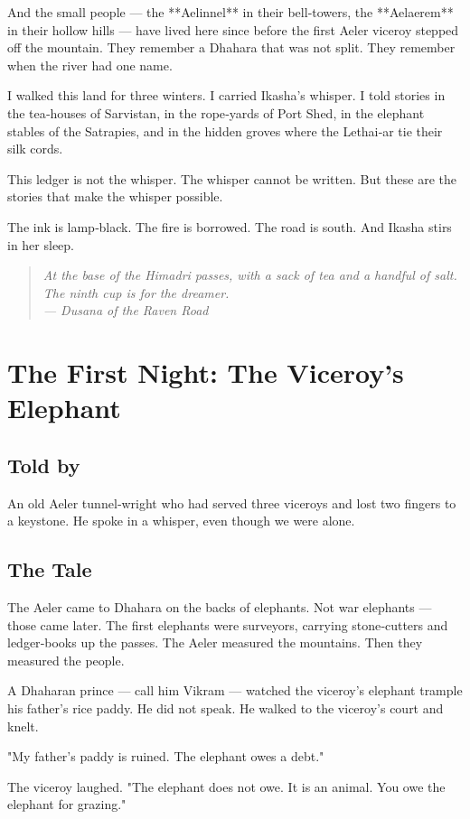 \documentclass[10pt,twoside]{book}
\newcommand{\dusana}[1]{\begin{quote}\itshape #1 \\ --- Dusana of the Raven Road\end{quote}}
\begin{document}
And the small people --- the **Aelinnel** in their bell‑towers, the **Aelaerem** in their hollow hills --- have lived here since before the first Aeler viceroy stepped off the mountain. They remember a Dhahara that was not split. They remember when the river had one name.

I walked this land for three winters. I carried Ikasha's whisper. I told stories in the tea‑houses of Sarvistan, in the rope‑yards of Port Shed, in the elephant stables of the Satrapies, and in the hidden groves where the Lethai‑ar tie their silk cords.

This ledger is not the whisper. The whisper cannot be written. But these are the stories that make the whisper possible.

The ink is lamp‑black. The fire is borrowed. The road is south. And Ikasha stirs in her sleep.

\dusana{At the base of the Himadri passes, with a sack of tea and a handful of salt. The ninth cup is for the dreamer.}

\chapter{The First Night: The Viceroy's Elephant}

\section*{Told by}
An old Aeler tunnel‑wright who had served three viceroys and lost two fingers to a keystone. He spoke in a whisper, even though we were alone.

\section*{The Tale}
The Aeler came to Dhahara on the backs of elephants. Not war elephants --- those came later. The first elephants were surveyors, carrying stone‑cutters and ledger‑books up the passes. The Aeler measured the mountains. Then they measured the people.

A Dhaharan prince --- call him Vikram --- watched the viceroy's elephant trample his father's rice paddy. He did not speak. He walked to the viceroy's court and knelt.

"My father's paddy is ruined. The elephant owes a debt."

The viceroy laughed. "The elephant does not owe. It is an animal. You owe the elephant for grazing."
\end{document}
